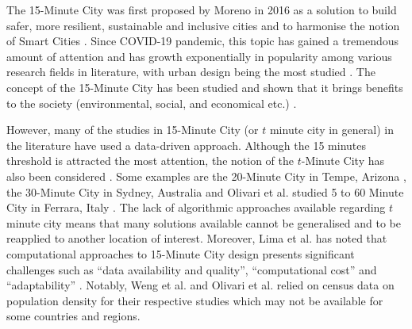 The 15-Minute City was first proposed by Moreno in 2016 as a solution to build safer, more resilient, sustainable and inclusive cities and to harmonise the notion of Smart Cities \cite{moreno_introducing_2021}. Since COVID-19 pandemic, this topic has gained a tremendous amount of attention and has growth exponentially in popularity \cite{lima_quest_2023,allam_theoretical_2022} among various research fields in literature, with urban design being the most studied \cite{lima_quest_2023}. The concept of the 15-Minute City has been studied and shown that it brings benefits to the society (environmental, social, and economical etc.) \cite{allam_theoretical_2022}.

However, many of the studies in 15-Minute City (or $t$ minute city in general) in the literature have used a data-driven approach. Although the 15 minutes threshold is attracted the most attention, the notion of the $t$-Minute City has also been considered \cite{moreno_introducing_2021}. Some examples are the 20-Minute City in Tempe, Arizona \cite{capasso_da_silva_accessibility_2019}, the 30-Minute City in Sydney, Australia \cite{sarkar_measuring_2020} and Olivari et al. studied 5 to 60 Minute City in Ferrara, Italy \cite{olivari_are_2023}. The lack of algorithmic approaches available regarding $t$ minute city means that many solutions available cannot be generalised and to be reapplied to another location of interest. Moreover, Lima et al. has noted that computational approaches to 15-Minute City design presents significant challenges such as “data availability and quality”, “computational cost” and “adaptability” \cite{lima_quest_2023}. Notably, Weng et al. \cite{weng_15-minute_2019} and Olivari et al.\cite{olivari_are_2023} relied on census data on population density for their respective studies which may not be available for some countries and regions. 